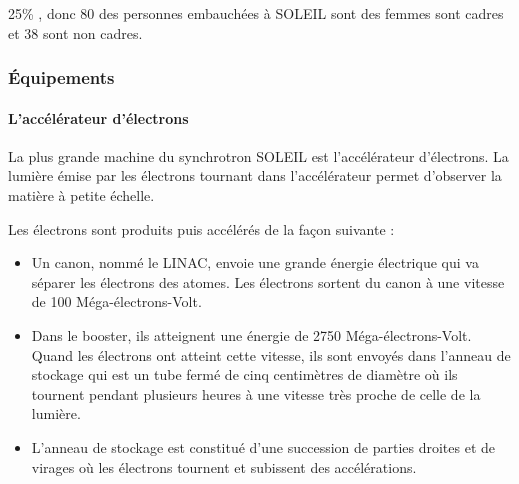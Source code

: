 				25\% , donc 80 des personnes embauchées à SOLEIL sont des femmes sont cadres et 38 sont non cadres.


		\subsubsection{Équipements}
			
			\paragraph{L'accélérateur d'électrons}
				La plus grande machine du synchrotron SOLEIL est l'accélérateur d'électrons. La lumière émise par les électrons tournant dans l'accélérateur permet d'observer la matière à petite échelle.
				
				Les électrons sont produits puis accélérés de la façon suivante : 
				\begin{itemize}
					\item Un canon, nommé le LINAC, envoie une grande énergie électrique qui va séparer les électrons des atomes. Les électrons sortent du canon à une vitesse de 100 Méga-électrons-Volt.  
					\item Dans le booster, ils atteignent une énergie de 2750 Méga-électrons-Volt. Quand les électrons ont atteint cette vitesse, ils sont envoyés dans l'anneau de stockage qui est un tube fermé de cinq centimètres de diamètre où ils tournent pendant plusieurs heures à une vitesse très proche de celle de la lumière. 

					\item L'anneau de stockage est constitué d'une succession de parties droites et de virages où les électrons tournent et subissent des accélérations. 
				\end{itemize}

